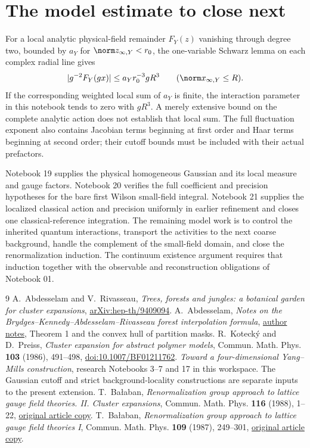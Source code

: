 \section{The model estimate to close next}
\label{oc18-next}

For a local analytic physical-field remainder $F_Y(z)$ vanishing
through degree two, bounded by $a_Y$ for $\norm z_{\infty,Y}<r_0$,
the one-variable Schwarz lemma on each complex radial line gives
\[
 |g^{-2}F_Y(gx)|\le a_Yr_0^{-3}gR^3
       \qquad (\norm x_{\infty,Y}\le R).
\]
If the corresponding weighted local sum of $a_Y$ is finite,
the interaction parameter in this notebook tends to zero with
$gR^3$. A merely extensive bound on the complete analytic action
does not establish that local sum. The full fluctuation exponent
also contains Jacobian terms beginning at first order and Haar
terms beginning at second order; their cutoff bounds must be
included with their actual prefactors.

Notebook 19 supplies the physical homogeneous Gaussian and its
local measure and gauge factors. Notebook 20 verifies the full
coefficient and precision hypotheses for the bare first Wilson
small-field integral. Notebook 21 supplies the localized
classical action and precision uniformly in earlier refinement
and closes one classical-reference integration. The remaining
model work is to control the inherited quantum interactions,
transport the activities to the next coarse background,
handle the complement of the small-field domain, and close the
renormalization induction. The continuum existence argument
requires that induction together with the observable and
reconstruction obligations of Notebook 01.

\begin{thebibliography}{9}
A.~Abdesselam and V.~Rivasseau,
\emph{Trees, forests and jungles: a botanical garden for cluster
expansions}, \href{https://arxiv.org/abs/hep-th/9409094}{arXiv:hep-th/9409094}.
A.~Abdesselam,
\emph{Notes on the Brydges--Kennedy--Abdesselam--Rivasseau
forest interpolation formula},
\href{https://mabdesselam.github.io/BKAR.pdf}{author notes},
Theorem 1 and the convex hull of partition masks.
R.~Koteck\'y and D.~Preiss,
\emph{Cluster expansion for abstract polymer models},
Commun. Math. Phys. \textbf{103} (1986), 491--498,
\href{https://doi.org/10.1007/BF01211762}{doi:10.1007/BF01211762}.
\emph{Toward a four-dimensional Yang--Mills construction},
research Notebooks 3--7 and 17 in this workspace.
The Gaussian cutoff and strict background-locality constructions
are separate inputs to the present extension.
T.~Ba\l aban,
\emph{Renormalization group approach to lattice gauge field
theories. II. Cluster expansions},
Commun. Math. Phys. \textbf{116} (1988), 1--22,
\href{https://scispace.com/pdf/renormalization-group-approach-to-lattice-gauge-field-4penm4k7hc.pdf}{original article copy}.
T.~Ba\l aban,
\emph{Renormalization group approach to lattice gauge field
theories I}, Commun. Math. Phys. \textbf{109} (1987), 249--301,
\href{https://scispace.com/pdf/renormalization-group-approach-to-lattice-gauge-field-3ygai0vxt1.pdf}{original article copy}.
\end{thebibliography}

